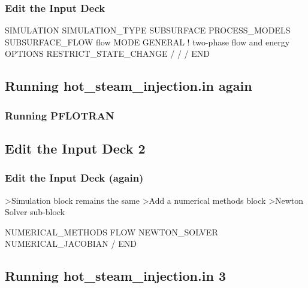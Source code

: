 \documentclass{beamer}
\begin{document}
\begin{frame}[fragile]\frametitle{Edit the Input Deck}

\begin{semiverbatim}

SIMULATION
  SIMULATION_TYPE SUBSURFACE
  PROCESS_MODELS
    SUBSURFACE_FLOW flow
      MODE GENERAL ! two-phase flow and energy
      OPTIONS
        RESTRICT_STATE_CHANGE
      /
    /
  /
END

\end{semiverbatim}

\end{frame}
\subsection{Running hot_steam_injection.in again}

\begin{frame}[fragile]\frametitle{Running PFLOTRAN}


\end{frame}

\subsection{Edit the Input Deck 2}

\begin{frame}[fragile]\frametitle{Edit the Input Deck (again)}

\begin{semiverbatim}
>Simulation block  remains the same
>Add a numerical methods block 
  >Newton Solver sub-block

NUMERICAL_METHODS FLOW
  NEWTON_SOLVER
    NUMERICAL_JACOBIAN
  /
END

\end{semiverbatim}

\end{frame}

\subsection{Running hot_steam_injection.in 3}
\end{document}
